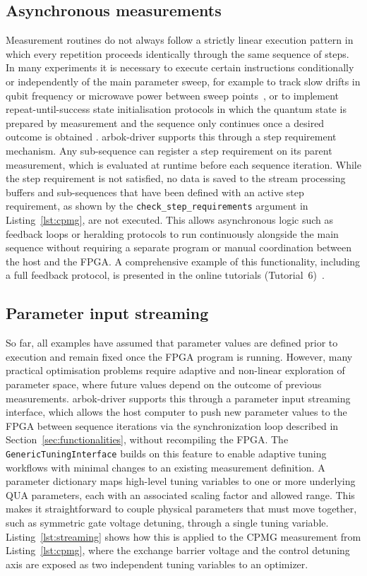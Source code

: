 \documentclass[numbers, preprint, twocolumn,10pt]{elsarticle}
\begin{document}
\subsection{Asynchronous measurements}
\noindent
Measurement routines do not always follow a strictly linear execution pattern in which every repetition proceeds identically through the same sequence of steps. In many experiments it is necessary to execute certain instructions conditionally or independently of the main parameter sweep, for example to track slow drifts in qubit frequency or microwave power between sweep points~\cite{dumoulin_stuyck_silicon_2024}, or to implement repeat-until-success state initialisation protocols in which the quantum state is prepared by measurement and the sequence only continues once a desired outcome is obtained \cite{huang_high-fidelity_2024}.
arbok-driver supports this through a step requirement mechanism. Any sub-sequence can register a step requirement on its parent measurement, which is evaluated at runtime before each sequence iteration. While the step requirement is not satisfied, no data is saved to the stream processing buffers and sub-sequences that have been defined with an active step requirement, as shown by the \texttt{check\_step\_requirements} argument in Listing~\ref{lst:cpmg}, are not executed. This allows asynchronous logic such as feedback loops or heralding protocols to run continuously alongside the main sequence without requiring a separate program or manual coordination between the host and the FPGA. A comprehensive example of this functionality, including a full feedback protocol, is presented in the online tutorials (Tutorial~6)~\cite{arbok_tuts}.

\subsection{Parameter input streaming}
\noindent
So far, all examples have assumed that parameter values are defined prior to execution and remain fixed once the FPGA program is running. However, many practical optimisation problems require adaptive and non-linear exploration of parameter space, where future values depend on the outcome of previous measurements. arbok-driver supports this through a parameter input streaming interface, which allows the host computer to push new parameter values to the FPGA between sequence iterations via the synchronization loop described in Section~\ref{sec:functionalities}, without recompiling the FPGA.
The \texttt{GenericTuningInterface} builds on this feature to enable adaptive tuning workflows with minimal changes to an existing measurement definition. A parameter dictionary maps high-level tuning variables to one or more underlying QUA parameters, each with an associated scaling factor and allowed range. This makes it straightforward to couple physical parameters that must move together, such as symmetric gate voltage detuning, through a single tuning variable. Listing~\ref{lst:streaming} shows how this is applied to the CPMG measurement from Listing~\ref{lst:cpmg}, where the exchange barrier voltage and the control detuning axis are exposed as two independent tuning variables to an optimizer.
\end{document}
